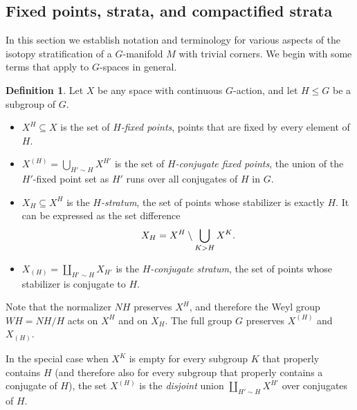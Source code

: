 \documentclass[11pt]{amsart}
\theoremstyle{definition}
\newtheorem{defn}{Definition}[section]
\numberwithin{equation}{section}
\numberwithin{figure}{section}
\begin{document}
\subsection{Fixed points, strata, and compactified strata}\label{strata}

In this section we establish notation and terminology for various aspects of the isotopy stratification of a $G$-manifold $M$ with trivial corners. We begin with some terms that apply to $G$-spaces in general.

\begin{defn}\label{fixed_points}
Let $X$ be any space with continuous $G$-action, and let $H \leq G$ be a subgroup of $G$.
	\begin{itemize}
		\item $X^H \subseteq X$ is the set of \emph{$H$-fixed points}, points that are fixed by every element of $H$. \vspace{0.2em}
		\item $X^{(H)} = \bigcup_{H' \sim H} X^{H'}$ is the set of \emph{$H$-conjugate fixed points}, the union of the $H'$-fixed point set as $H'$ runs over all conjugates of $H$ in $G$. \vspace{0.2em}
		\item $X_H \subseteq X^H$ is the \emph{$H$-stratum}, the set of points whose stabilizer is exactly $H$. It can be expressed as the set difference%
	\[ X_H = X^H \Large \setminus \bigcup_{K > H} X^K. \]
		\item $X_{(H)} = \coprod_{H'\sim H} X_{H'}$ is the \emph{$H$-conjugate stratum}, the set of points whose stabilizer is conjugate to $H$.
	\end{itemize}
\end{defn}

Note that the normalizer $NH$ preserves $X^H$, and therefore the Weyl group $WH = NH/H$ acts on $X^H$ and on $X_H$. The full group $G$ preserves $X^{(H)}$ and $X_{(H)}$.

In the special case when $X^K$ is empty for every subgroup $K$ that properly contains $H$ (and therefore also for every subgroup that properly contains a conjugate of $H$), the set $X^{(H)}$ is the \emph{disjoint} union $\coprod_{H'\sim H} X^{H'}$ over conjugates of $H$. %

\end{document}

